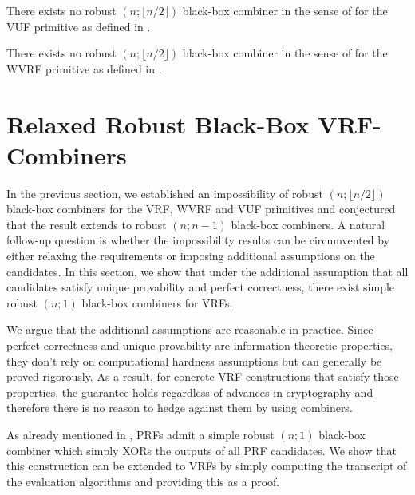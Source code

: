 \begin{corollary}\label{cor:impossibility_vrf_comb}
	There exists no robust $(n;\lfloor n/2\rfloor)$ black-box combiner in the sense of 
	for the VUF primitive as defined in .
\end{corollary}

\begin{corollary}\label{cor:impossibility_vuf_comb}
	There exists no robust $(n;\lfloor n/2\rfloor)$ black-box combiner in the sense of 
	for the WVRF primitive as defined in .
\end{corollary}

\newpage

\section{Relaxed Robust Black-Box VRF-Combiners}

In the previous section, we established an impossibility of robust $(n;\lfloor n/2\rfloor)$ black-box combiners for the
VRF, WVRF and VUF primitives and conjectured that the result extends to robust $(n;n-1)$ black-box combiners.
A natural follow-up question is whether the impossibility results can be circumvented by either relaxing the requirements or imposing 
additional assumptions on the candidates. In this section, we show that under the additional assumption that all candidates 
satisfy unique provability and perfect correctness, there exist simple robust $(n;1)$ black-box combiners for VRFs.

We argue that the additional assumptions are reasonable in practice.
Since perfect correctness and unique provability are information-theoretic properties, they don't rely on
computational hardness assumptions but can generally be proved rigorously.
As a result, for concrete VRF constructions that satisfy those properties, the guarantee holds 
regardless of advances in cryptography and therefore there is no reason to hedge against them by using combiners.

As already mentioned in , PRFs admit a simple robust $(n;1)$ black-box combiner
which simply XORs the outputs of all PRF candidates. We show that this construction 
can be extended to VRFs by simply computing the transcript of the evaluation algorithms 
and providing this as a proof. 

